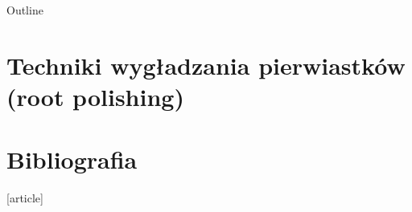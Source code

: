 

\subtitle{8. Arytmetyka komputerowa}


  \maketitle
	\begin{frame}{Outline}
		\tableofcontents
	\end{frame}

  

  

  

  

  

  

  \section{Techniki wygładzania pierwiastków (root polishing)}

  

  

  

  \section{Bibliografia}

  \begin{frame}
      \begin{thebibliography}{9}
          [article]
      \end{thebibliography}
  \end{frame}


